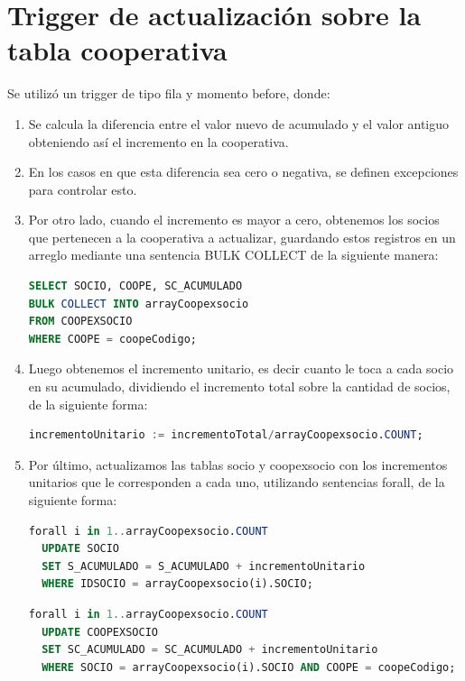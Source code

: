 \documentclass{article}
\begin{document}
\section{Trigger de actualización sobre la tabla cooperativa}\label{sec:trigger-de-actualizacion-cooperativa}
    Se utilizó un trigger de tipo fila y momento before, donde:
    \begin{enumerate}
    \begin{enumerate}[3.1]
        \item Se calcula la diferencia entre el valor nuevo de acumulado y el valor antiguo obteniendo así el incremento en la cooperativa.
        \item En los casos en que esta diferencia sea cero o negativa, se definen excepciones para controlar esto.
        \item Por otro lado, cuando el incremento es mayor a cero, obtenemos los socios que pertenecen a la cooperativa a actualizar, guardando estos registros en un arreglo mediante una sentencia BULK COLLECT de la siguiente manera:

\begin{lstlisting}[language=SQL,label={lst:lstlisting2}]
SELECT SOCIO, COOPE, SC_ACUMULADO
BULK COLLECT INTO arrayCoopexsocio
FROM COOPEXSOCIO
WHERE COOPE = coopeCodigo;
\end{lstlisting}

        \item Luego obtenemos el incremento unitario, es decir cuanto le toca a cada socio en su acumulado, dividiendo el incremento total sobre la cantidad de socios, de la siguiente forma:

\begin{lstlisting}[language=SQL,label={lst:lstlisting3}]
incrementoUnitario := incrementoTotal/arrayCoopexsocio.COUNT;
\end{lstlisting}
        \item Por último, actualizamos las tablas socio y coopexsocio con los incrementos unitarios que le corresponden a cada uno, utilizando sentencias forall, de la siguiente forma:
\begin{lstlisting}[language=SQL,label={lst:lstlisting4}]
forall i in 1..arrayCoopexsocio.COUNT
  UPDATE SOCIO
  SET S_ACUMULADO = S_ACUMULADO + incrementoUnitario
  WHERE IDSOCIO = arrayCoopexsocio(i).SOCIO;
\end{lstlisting}

\begin{lstlisting}[language=SQL,label={lst:lstlisting5}]
forall i in 1..arrayCoopexsocio.COUNT
  UPDATE COOPEXSOCIO
  SET SC_ACUMULADO = SC_ACUMULADO + incrementoUnitario
  WHERE SOCIO = arrayCoopexsocio(i).SOCIO AND COOPE = coopeCodigo;
\end{lstlisting}
    \end{enumerate}
    \end{enumerate}
\end{document}
